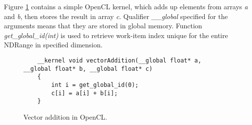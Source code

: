 \documentclass
[
    digital, %
    oneside, %
    table, %
    nolof, %
    nolot, %
    nocover %
]{fithesis3}
\begin{document}
Figure \ref{vector_addition} contains a simple OpenCL kernel, which adds up elements from arrays \textit{a} and \textit{b}, then stores the result in
array \textit{c}. Qualifier \textit{\_\_global} specified for the arguments means that they are stored in global memory. Function
\textit{get\_global\_id(int)} is used to retrieve work-item index unique for the entire NDRange in specified dimension.
\begin{figure}
    \begin{lstlisting}
    __kernel void vectorAddition(__global float* a, __global float* b, __global float* c)
    {
        int i = get_global_id(0);
        c[i] = a[i] + b[i];
    }
    \end{lstlisting}
    \caption{Vector addition in OpenCL.}
    \label{vector_addition}
\end{figure}
\end{document}
